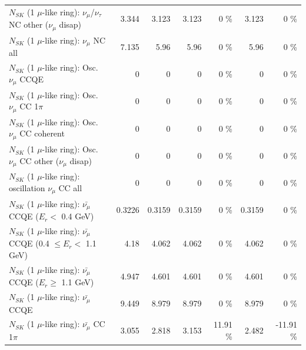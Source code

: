 \begin{table}
\begin{tabular}{| l | r | r | r  r | r  r |}
   $N_{SK}$ (1 $\mu$-like ring): $\nu_\mu$/$\nu_\tau$ NC other ($\nu_\mu$ disap) &           3.344 &           3.123 &           3.123 &        0 \%  &           3.123 &        0 \%  \\ 
                                $N_{SK}$ (1 $\mu$-like ring): $\nu_{\mu}$ NC all &           7.135 &            5.96 &            5.96 &        0 \%  &            5.96 &        0 \%  \\ 
\hline
\hline
                               $N_{SK}$ (1 $\mu$-like ring): Osc. $\nu_\mu$ CCQE &               0 &               0 &               0 &        0 \%  &               0 &        0 \%  \\ 
                          $N_{SK}$ (1 $\mu$-like ring): Osc. $\nu_\mu$ CC 1$\pi$ &               0 &               0 &               0 &        0 \%  &               0 &        0 \%  \\ 
                        $N_{SK}$ (1 $\mu$-like ring): Osc. $\nu_\mu$ CC coherent &               0 &               0 &               0 &        0 \%  &               0 &        0 \%  \\ 
         $N_{SK}$ (1 $\mu$-like ring): Osc. $\nu_\mu$ CC other ($\nu_\mu$ disap) &               0 &               0 &               0 &        0 \%  &               0 &        0 \%  \\ 
                      $N_{SK}$ (1 $\mu$-like ring): oscillation $\nu_\mu$ CC all &               0 &               0 &               0 &        0 \%  &               0 &        0 \%  \\ 
\hline
\hline
          $N_{SK}$ (1 $\mu$-like ring): $\bar{\nu_\mu}$ CCQE ($E_{r} <$ 0.4 GeV) &          0.3226 &          0.3159 &          0.3159 &        0 \%  &          0.3159 &        0 \%  \\ 
 $N_{SK}$ (1 $\mu$-like ring): $\bar{\nu_\mu}$ CCQE (0.4 $\leq E_{r} <$ 1.1 GeV) &            4.18 &           4.062 &           4.062 &        0 \%  &           4.062 &        0 \%  \\ 
       $N_{SK}$ (1 $\mu$-like ring): $\bar{\nu_\mu}$ CCQE ($E_{r} \geq$ 1.1 GeV) &           4.947 &           4.601 &           4.601 &        0 \%  &           4.601 &        0 \%  \\ 
\hline
                              $N_{SK}$ (1 $\mu$-like ring): $\bar{\nu_\mu}$ CCQE &           9.449 &           8.979 &           8.979 &        0 \%  &           8.979 &        0 \%  \\ 
                         $N_{SK}$ (1 $\mu$-like ring): $\bar{\nu_\mu}$ CC 1$\pi$ &           3.055 &           2.818 &           3.153 &    11.91 \%  &           2.482 &   -11.91 \%  \\ 

\end{tabular}
\end{table}

